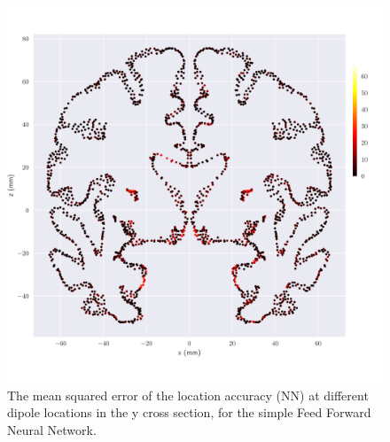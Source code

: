 \documentclass[a4paper, UKenglish, 11pt]{uiomaster}
\begin{document}
\begin{figure}[!htb]
    \centering
    \includegraphics[width=\linewidth]{../Code/plots/finals/mse_y_plane.pdf}
    \caption{The mean squared error of the location accuracy (NN) at different dipole locations
    in the y cross section, for the simple Feed Forward Neural Network.}
    \label{fig:single_dipole_accuracy_plane}
\end{figure}






\end{document}
